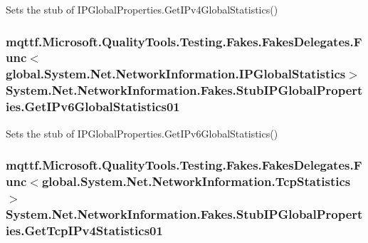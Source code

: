Sets the stub of I\-P\-Global\-Properties.\-Get\-I\-Pv4\-Global\-Statistics()

\hypertarget{class_system_1_1_net_1_1_network_information_1_1_fakes_1_1_stub_i_p_global_properties_a13913451380f8c76437b297fa302d674}{
\subsubsection[{Get\-I\-Pv6\-Global\-Statistics01}]{\setlength{\rightskip}{0pt plus 5cm}mqttf.\-Microsoft.\-Quality\-Tools.\-Testing.\-Fakes.\-Fakes\-Delegates.\-Func$<$global.\-System.\-Net.\-Network\-Information.\-I\-P\-Global\-Statistics$>$ System.\-Net.\-Network\-Information.\-Fakes.\-Stub\-I\-P\-Global\-Properties.\-Get\-I\-Pv6\-Global\-Statistics01}}\label{class_system_1_1_net_1_1_network_information_1_1_fakes_1_1_stub_i_p_global_properties_a13913451380f8c76437b297fa302d674}


Sets the stub of I\-P\-Global\-Properties.\-Get\-I\-Pv6\-Global\-Statistics()

\hypertarget{class_system_1_1_net_1_1_network_information_1_1_fakes_1_1_stub_i_p_global_properties_a0c5722992d6ab058a5fc8a5268529b3c}{
\subsubsection[{Get\-Tcp\-I\-Pv4\-Statistics01}]{\setlength{\rightskip}{0pt plus 5cm}mqttf.\-Microsoft.\-Quality\-Tools.\-Testing.\-Fakes.\-Fakes\-Delegates.\-Func$<$global.\-System.\-Net.\-Network\-Information.\-Tcp\-Statistics$>$ System.\-Net.\-Network\-Information.\-Fakes.\-Stub\-I\-P\-Global\-Properties.\-Get\-Tcp\-I\-Pv4\-Statistics01}}\label{class_system_1_1_net_1_1_network_information_1_1_fakes_1_1_stub_i_p_global_properties_a0c5722992d6ab058a5fc8a5268529b3c}


